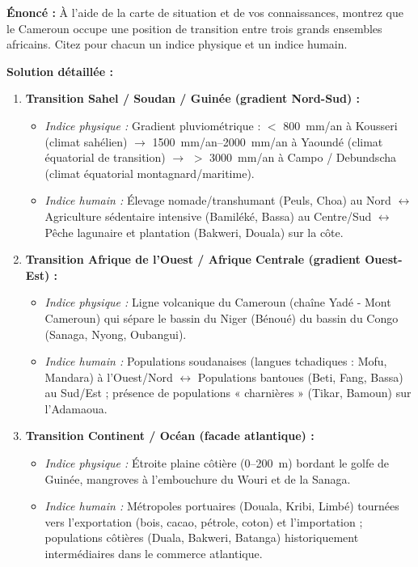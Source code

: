 \documentclass[11pt]{article}
\begin{document}
\begin{exoresolu}
\textbf{Énoncé :} À l'aide de la carte de situation et de vos connaissances, montrez que le Cameroun occupe une position de transition entre trois grands ensembles africains. Citez pour chacun un indice physique et un indice humain.

\textbf{Solution détaillée :}
\begin{enumerate}
    \item \textbf{Transition Sahel / Soudan / Guinée (gradient Nord-Sud) :}
        \begin{itemize}
            \item \textit{Indice physique :} Gradient pluviométrique : $<$ \SI{800}{mm/an} à Kousseri (climat sahélien) $\rightarrow$ \SIrange{1500}{2000}{mm/an} à Yaoundé (climat équatorial de transition) $\rightarrow$ $>$ \SI{3000}{mm/an} à Campo / Debundscha (climat équatorial montagnard/maritime).
            \item \textit{Indice humain :} Élevage nomade/transhumant (Peuls, Choa) au Nord $\leftrightarrow$ Agriculture sédentaire intensive (Bamiléké, Bassa) au Centre/Sud $\leftrightarrow$ Pêche lagunaire et plantation (Bakweri, Douala) sur la côte.
        \end{itemize}
    \item \textbf{Transition Afrique de l'Ouest / Afrique Centrale (gradient Ouest-Est) :}
        \begin{itemize}
            \item \textit{Indice physique :} Ligne volcanique du Cameroun (chaîne Yadé - Mont Cameroun) qui sépare le bassin du Niger (Bénoué) du bassin du Congo (Sanaga, Nyong, Oubangui).
            \item \textit{Indice humain :} Populations soudanaises (langues tchadiques : Mofu, Mandara) à l'Ouest/Nord $\leftrightarrow$ Populations bantoues (Beti, Fang, Bassa) au Sud/Est ; présence de populations « charnières » (Tikar, Bamoun) sur l'Adamaoua.
        \end{itemize}
    \item \textbf{Transition Continent / Océan (facade atlantique) :}
        \begin{itemize}
            \item \textit{Indice physique :} Étroite plaine côtière (0--\SI{200}{m}) bordant le golfe de Guinée, mangroves à l'embouchure du Wouri et de la Sanaga.
            \item \textit{Indice humain :} Métropoles portuaires (Douala, Kribi, Limbé) tournées vers l'exportation (bois, cacao, pétrole, coton) et l'importation ; populations côtières (Duala, Bakweri, Batanga) historiquement intermédiaires dans le commerce atlantique.
        \end{itemize}
\end{enumerate}
\end{exoresolu}
\end{document}
